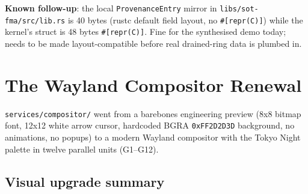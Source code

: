 \documentclass[11pt,a4paper]{article}
\begin{document}
\textbf{Known follow-up}: the local \texttt{ProvenanceEntry} mirror in
\texttt{libs/sot-fma/src/lib.rs} is 40 bytes (rustc default field
layout, no \texttt{\#[repr(C)]}) while the kernel's struct is 48 bytes
\texttt{\#[repr(C)]}. Fine for the synthesised demo today; needs to be
made layout-compatible before real drained-ring data is plumbed in.

\section{The Wayland Compositor Renewal}

\texttt{services/compositor/} went from a barebones engineering preview
(8x8 bitmap font, 12x12 white arrow cursor, hardcoded BGRA
\texttt{0xFF2D2D3D} background, no animations, no popups) to a
modern Wayland compositor with the Tokyo Night palette in twelve
parallel units (G1--G12).

\subsection{Visual upgrade summary}
\end{document}
